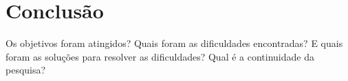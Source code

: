 \chapter{Conclusão}\par
Os objetivos foram atingidos? Quais foram as dificuldades encontradas? E quais foram as soluções para resolver as dificuldades? Qual é a continuidade da pesquisa?